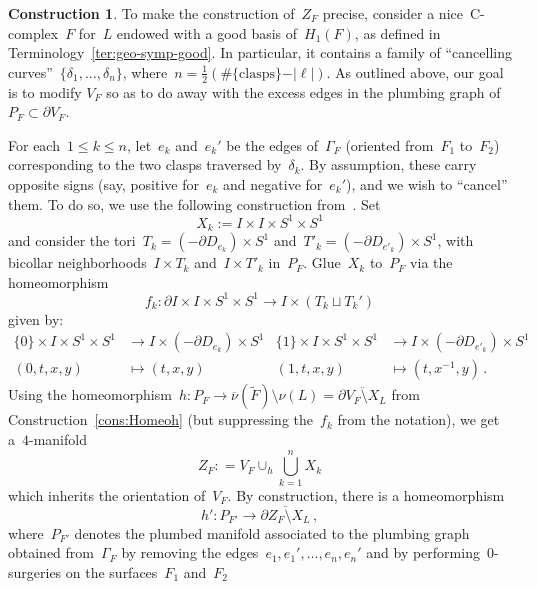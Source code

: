 \documentclass[10.9pt,a4paper]{amsart}
\theoremstyle{definition}
\newtheorem{construction}[theorem]{Construction}
\theoremstyle{remark}
\newcommand{\onu}{\overline{\nu}}
\begin{document}
\begin{construction}
\label{cons:ZF}
To make the construction of~$Z_F$ precise, consider a nice~C-complex~$F$ for~$L$ endowed with a good basis of~$H_1(F)$, 
as defined in Terminology~\ref{ter:geo-symp-good}. In particular, it contains a family of ``cancelling curves''~$\{\delta_1, \dots, \delta_n\}$, where~$n=\frac{1}{2}(\#\{\text{clasps}\}-\vert\ell\vert)$.
As outlined above, our goal is to modify $V_F$ so as to do away with the excess edges in the plumbing graph of $P_F \subset \partial V_F$.


For each~$1\le k\le n$, let~$e_k$ and~$e_k'$ be the edges of~$\Gamma_F$ (oriented from~$F_1$ to~$F_2$) corresponding to the two clasps traversed by~$\delta_k$. By assumption, these carry opposite signs (say, positive for~$e_k$ and negative for~$e_k'$), and we wish to ``cancel'' them. 
To do so, we use the following construction from~\cite[Lemma~4.9]{ConwayNagelToffoli}. Set 
$$X_k := I \times I \times S^1 \times S^1$$
and consider the tori~$T_{k} = (-\partial D_{e_k}) \times S^1$ and~$T'_{k}= (-\partial D_{e'_k}) \times S^1$, with bicollar neighborhoods~$I \times T_k$ and~$I\times T'_k$ in~$P_F$. Glue~$X_k$ to~$P_F$ via the homeomorphism
\begin{equation*}
f_k\colon \partial I\times I\times S^1\times S^1\to I\times (T_k\sqcup T_k')
\end{equation*}
given by:
\begin{align*}
\{0\} \times I \times S^1 \times S^1 &\longrightarrow I \times (-\partial D_{e_k}) \times S^1 &
\{1\} \times I \times S^1 \times S^1 &\longrightarrow I \times (-\partial D_{e'_k}) \times S^1 \\
(0,t,x,y) &\longmapsto (t,x,y) &
(1,t,x,y) &\longmapsto (t,x^{-1},y)\,.
\end{align*}
Using the homeomorphism~$h\colon P_F\to\onu(\tilde{F}) \setminus \nu(L)=\overline{\partial V_F \setminus X_L}$ from Construction~\ref{cons:Homeoh}
(but suppressing the~$f_k$ from the notation),
we get a~$4$-manifold
\begin{equation}
\label{equ:def-Z}
Z_F : = V_F \cup_{h} \bigcup_{k=1}^{n} X_k
\end{equation}
which inherits the orientation of~$V_F$.
By construction, there is a homeomorphism
\begin{equation}
\label{equ:def-h'}
h' \colon P_{F'} \to \overline{\partial Z_F\setminus X_L}\,,
\end{equation}
where~$P_{F'}$ denotes the plumbed manifold associated to the plumbing graph obtained from~$\Gamma_F$ by removing the edges~$e_1, e_1', \ldots ,e_n, e_n'$ and by performing~$0$-surgeries on the surfaces~$F_1$ and~$F_2$

\end{construction}
\end{document}
